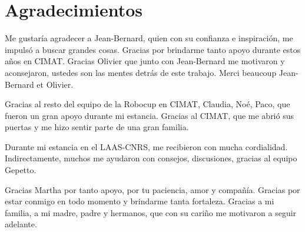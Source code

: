 \chapter*{Agradecimientos}
\thispagestyle{empty}

Me gustaría agradecer a Jean-Bernard, quien con su confianza e inspiraci\'on, me impuls\'o a buscar grandes cosas. Gracias por brindarme tanto apoyo durante estos a\~nos en CIMAT. Gracias Olivier que junto con Jean-Bernard me motivaron y aconsejaron, ustedes son las mentes detr\'as de este trabajo. Merci beaucoup Jean-Bernard et Olivier.

Gracias al resto del equipo de la Robocup en CIMAT, Claudia, No\'e, Paco, que fueron un gran apoyo durante mi estancia. Gracias al CIMAT, que me abri\'o sus puertas y me hizo sentir parte de una gran familia.

Durante mi estancia en el LAAS-CNRS, me recibieron con mucha cordialidad. Indirectamente, muchos me ayudaron con consejos, discusiones, gracias al equipo Gepetto.

Gracias Martha por tanto apoyo, por tu paciencia, amor y compa\~n\'ia. Gracias por estar conmigo en todo momento y brindarme tanta fortaleza. Gracias a mi familia, a mi madre, padre y hermanos, que con su cari\~no me motivaron a seguir adelante.
